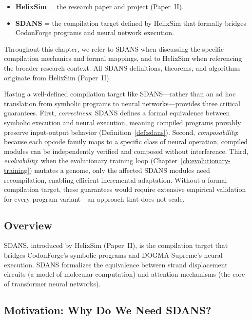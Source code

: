 \begin{itemize}[leftmargin=1.8em]
  \item \textbf{HelixSim} = the research paper and project (Paper~II).
  \item \textbf{SDANS} = the compilation target defined by HelixSim that formally bridges CodonForge programs and neural network execution.
\end{itemize}

\noindent
Throughout this chapter, we refer to SDANS when discussing the specific compilation mechanics and formal mappings, and to HelixSim when referencing the broader research context. All SDANS definitions, theorems, and algorithms originate from HelixSim (Paper~II).

\begin{keyinsight}
Having a well-defined compilation target like SDANS---rather than an ad hoc translation from symbolic programs to neural networks---provides three critical guarantees. First, \emph{correctness}: SDANS defines a formal equivalence between symbolic execution and neural execution, meaning compiled programs provably preserve input-output behavior (Definition~\ref{def:sdans}). Second, \emph{composability}: because each opcode family maps to a specific class of neural operation, compiled modules can be independently verified and composed without interference. Third, \emph{evolvability}: when the evolutionary training loop (Chapter~\ref{ch:evolutionary-training}) mutates a genome, only the affected SDANS modules need recompilation, enabling efficient incremental adaptation. Without a formal compilation target, these guarantees would require extensive empirical validation for every program variant---an approach that does not scale.
\end{keyinsight}

\subsection{Overview}

SDANS, introduced by HelixSim (Paper~II), is the compilation target that bridges CodonForge's symbolic programs and DOGMA-Supreme's neural execution. SDANS formalizes the equivalence between strand displacement circuits (a model of molecular computation) and attention mechanisms (the core of transformer neural networks).

\subsection{Motivation: Why Do We Need SDANS?}

